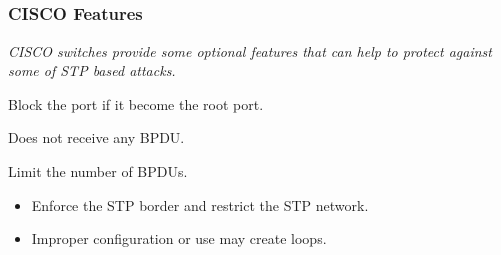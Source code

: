 \documentclass[10pt, blue,subsection=true, compress]{beamer}
\begin{document}
\subsection*{}
\begin{frame} \frametitle{CISCO Features }
\emph{\textit{CISCO} switches provide some optional features that can help to protect against some of STP based attacks.}\\
\begin{description}
\item[Root Guard: ] Block the port if it become the root port.
\item[BPDU Guard: ] Does not receive any BPDU.
\item[Layer 2 PDU Rate Limiter: ]  Limit the number of BPDUs.
\end{description}
	     

\begin{itemize}
\item  Enforce the STP border and restrict the STP network.
\item  Improper configuration or use may create loops.
\end{itemize}
\end{frame} 

\end{document}
